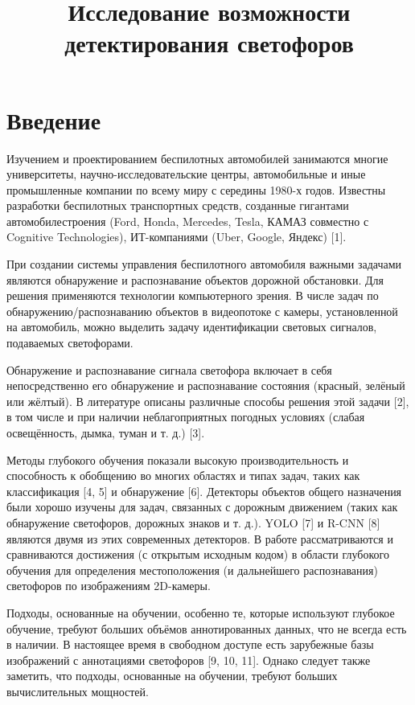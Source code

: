 \documentclass{misisarticle}
\title{Исследование возможности детектирования светофоров}
\begin{document}
\maketitle

\section{Введение}

Изучением и проектированием беспилотных автомобилей занимаются многие университеты, научно-исследовательские центры, автомобильные и иные промышленные компании по всему миру с середины 1980-х годов. Известны разработки беспилотных транспортных средств, созданные гигантами автомобилестроения (Ford, Honda, Mercedes, Tesla, КАМАЗ совместно с Cognitive Technologies), ИТ-компаниями (Uber, Google, Яндекс) [1].

При создании системы управления беспилотного автомобиля важными задачами являются обнаружение и распознавание объектов дорожной обстановки. Для решения применяются технологии компьютерного зрения. В числе задач по обнаружению/распознаванию объектов в видеопотоке с камеры, установленной на автомобиль, можно выделить задачу идентификации световых сигналов, подаваемых светофорами.

Обнаружение и распознавание сигнала светофора включает в себя непосредственно его обнаружение и распознавание состояния (красный, зелёный или жёлтый). В литературе описаны различные способы решения этой задачи [2], в том числе и при наличии неблагоприятных погодных условиях (слабая освещённость, дымка, туман и т. д.) [3].

Методы глубокого обучения показали высокую производительность и способность к обобщению во многих областях и типах задач, таких как классификация [4, 5] и обнаружение [6]. Детекторы объектов общего назначения были хорошо изучены для задач, связанных с дорожным движением (таких как обнаружение светофоров, дорожных знаков и т. д.). YOLO [7] и R-CNN [8] являются двумя из этих современных детекторов. В работе рассматриваются и сравниваются достижения (с открытым исходным кодом) в области глубокого обучения для определения местоположения (и дальнейшего распознавания) светофоров по изображениям 2D-камеры.

Подходы, основанные на обучении, особенно те, которые используют глубокое обучение, требуют больших объёмов аннотированных данных, что не всегда есть в наличии. В настоящее время в свободном доступе есть зарубежные базы изображений с аннотациями светофоров [9, 10, 11]. Однако следует также заметить, что подходы, основанные на обучении, требуют больших вычислительных мощностей.
\end{document}
